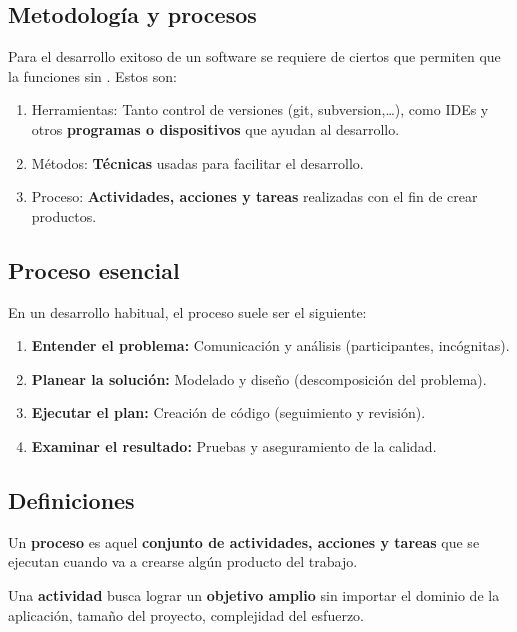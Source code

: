 \subsection{Metodología y procesos}\label{subsec:metodologia-y-procesos}
Para el desarrollo exitoso de un software se requiere de ciertos  que permiten que la  funciones sin .
Estos  son:
\begin{enumerate}
    \item Herramientas: Tanto control de versiones (git, subversion,\dots), como IDEs y otros \textbf{programas o dispositivos} que ayudan al desarrollo.
    \item Métodos: \textbf{Técnicas} usadas para facilitar el desarrollo.
    \item Proceso: \textbf{Actividades, acciones y tareas} realizadas con el fin de crear productos.
\end{enumerate}

\subsection{Proceso esencial}\label{subsec:proceso-esencial}
En un desarrollo habitual, el proceso suele ser el siguiente:

\begin{enumerate}
    \item \textbf{Entender el problema:} Comunicación y análisis (participantes, incógnitas).
    \item \textbf{Planear la solución:} Modelado y diseño (descomposición del problema).
    \item \textbf{Ejecutar el plan:} Creación de código (seguimiento y revisión).
    \item \textbf{Examinar el resultado:} Pruebas y aseguramiento de la calidad.
\end{enumerate}

\subsection{Definiciones}\label{subsec:definiciones-metodologia-y-procesos}
\begin{definicion}
    Un \textbf{proceso} es aquel \textbf{conjunto de actividades, acciones y tareas} que se ejecutan cuando va a crearse algún producto del trabajo.
\end{definicion}
\begin{definicion}
    Una \textbf{actividad} busca lograr un \textbf{objetivo amplio} sin importar el dominio de la aplicación, tamaño del proyecto, complejidad del esfuerzo.
\end{definicion}

